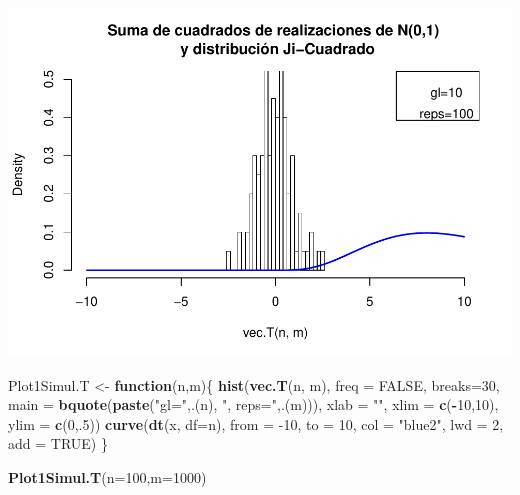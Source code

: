 \documentclass[]{article}
\newenvironment{Shaded}{\begin{snugshade}}{\end{snugshade}}
\newcommand{\ControlFlowTok}[1]{\textcolor[rgb]{0.13,0.29,0.53}{\textbf{#1}}}
\newcommand{\DataTypeTok}[1]{\textcolor[rgb]{0.13,0.29,0.53}{#1}}
\newcommand{\DecValTok}[1]{\textcolor[rgb]{0.00,0.00,0.81}{#1}}
\newcommand{\KeywordTok}[1]{\textcolor[rgb]{0.13,0.29,0.53}{\textbf{#1}}}
\newcommand{\NormalTok}[1]{#1}
\newcommand{\OperatorTok}[1]{\textcolor[rgb]{0.81,0.36,0.00}{\textbf{#1}}}
\newcommand{\OtherTok}[1]{\textcolor[rgb]{0.56,0.35,0.01}{#1}}
\newcommand{\StringTok}[1]{\textcolor[rgb]{0.31,0.60,0.02}{#1}}
\begin{document}
\includegraphics{NotaDeClaseLong_files/figure-latex/unnamed-chunk-15-1.pdf}

\begin{Shaded}
\begin{Highlighting}[]
\NormalTok{Plot1Simul.T <-}\StringTok{ }\ControlFlowTok{function}\NormalTok{(n,m)\{}
  \KeywordTok{hist}\NormalTok{(}\KeywordTok{vec.T}\NormalTok{(n, m), }\DataTypeTok{freq =} \OtherTok{FALSE}\NormalTok{, }\DataTypeTok{breaks=}\DecValTok{30}\NormalTok{,}
       \DataTypeTok{main =} \KeywordTok{bquote}\NormalTok{(}\KeywordTok{paste}\NormalTok{(}\StringTok{"gl="}\NormalTok{,.(n), }\StringTok{", reps="}\NormalTok{,.(m))),}
       \DataTypeTok{xlab =} \StringTok{""}\NormalTok{,}
       \DataTypeTok{xlim =} \KeywordTok{c}\NormalTok{(}\OperatorTok{-}\DecValTok{10}\NormalTok{,}\DecValTok{10}\NormalTok{), }\DataTypeTok{ylim =} \KeywordTok{c}\NormalTok{(}\DecValTok{0}\NormalTok{,.}\DecValTok{5}\NormalTok{))}
  \KeywordTok{curve}\NormalTok{(}\KeywordTok{dt}\NormalTok{(x, }\DataTypeTok{df=}\NormalTok{n),}
        \DataTypeTok{from =} \DecValTok{-10}\NormalTok{, }\DataTypeTok{to =} \DecValTok{10}\NormalTok{,}
        \DataTypeTok{col  =} \StringTok{"blue2"}\NormalTok{,}
        \DataTypeTok{lwd  =} \DecValTok{2}\NormalTok{,}
        \DataTypeTok{add  =} \OtherTok{TRUE}\NormalTok{)}
\NormalTok{\}}


\KeywordTok{Plot1Simul.T}\NormalTok{(}\DataTypeTok{n=}\DecValTok{100}\NormalTok{,}\DataTypeTok{m=}\DecValTok{1000}\NormalTok{)}
\end{Highlighting}
\end{Shaded}
\end{document}
